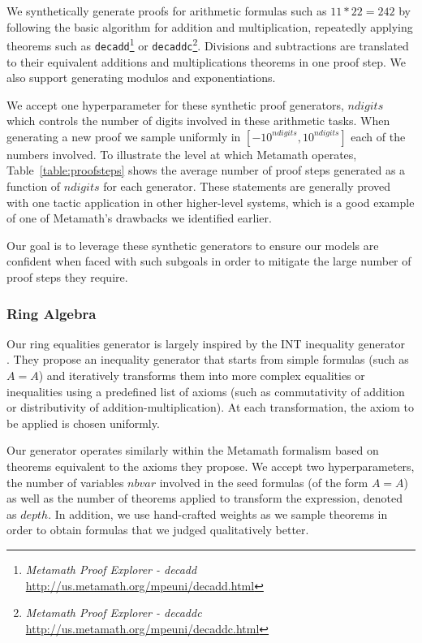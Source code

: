 We synthetically generate proofs for arithmetic formulas such as $11*22=242$ by following the basic algorithm for addition and multiplication, repeatedly applying theorems such as \verb|decadd|\footnote{\textit{Metamath Proof Explorer - decadd} \url{http://us.metamath.org/mpeuni/decadd.html}} or \verb|decaddc|\footnote{\textit{Metamath Proof Explorer - decaddc} \url{http://us.metamath.org/mpeuni/decaddc.html}}. Divisions and subtractions are translated to their equivalent additions and multiplications theorems in one proof step. We also support generating modulos and exponentiations.

We accept one hyperparameter for these synthetic proof generators, $\mathit{ndigits}$ which controls the number of digits involved in these arithmetic tasks. When generating a new proof we sample uniformly in $[-10^{\mathit{ndigits}}, 10^{\mathit{ndigits}}]$ each of the numbers involved. To illustrate the level at which Metamath operates, Table~\ref{table:proofsteps} shows the average number of proof steps generated as a function of $\mathit{ndigits}$ for each generator. These statements are generally proved with one tactic application in other higher-level systems, which is a good example of one of Metamath's drawbacks we identified earlier.

Our goal is to leverage these synthetic generators to ensure our models are confident when faced with such subgoals in order to mitigate the large number of proof steps they require.

\subsubsection{Ring Algebra}

Our ring equalities generator is largely inspired by the INT inequality generator~\cite{wu2020int} . They propose an inequality generator that starts from simple formulas (such as $A=A$) and iteratively transforms them into more complex equalities or inequalities using a predefined list of axioms (such as commutativity of addition or distributivity of addition-multiplication). At each transformation, the axiom to be applied is chosen uniformly.

Our generator operates similarly within the Metamath formalism based on theorems equivalent to the axioms they propose. We accept two hyperparameters, the number of variables $\mathit{nbvar}$ involved in the seed formulas (of the form $A=A$) as well as the number of theorems applied to transform the expression, denoted as $\mathit{depth}$. In addition, we use hand-crafted weights as we sample theorems in order to obtain formulas that we judged qualitatively better.

